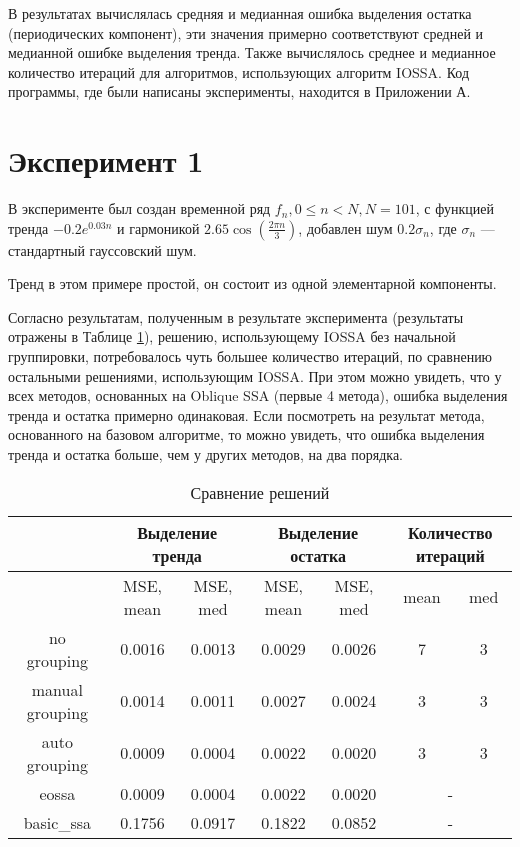 \documentclass[specialist, substylefile = spbureport.rtx, subf,href,colorlinks=true, 12pt]{disser}
\theoremstyle{definition}
\begin{document}
В результатах вычислялась средняя и медианная ошибка выделения остатка (периодических компонент), эти значения примерно соответствуют средней и медианной ошибке выделения тренда. Также вычислялось среднее и медианное количество итераций для алгоритмов, использующих алгоритм IOSSA.
Код программы, где были написаны эксперименты, находится в Приложении А.

\section{Эксперимент 1}
\label{exp1}
В эксперименте был создан временной ряд $f_n , 0\leq n < N, N=101$, с функцией тренда $-0.2 e^{0.03n}$ и гармоникой $2.65 \cos (\frac{2\pi n}{3})$, добавлен шум $0.2 \sigma_n$, где $\sigma_n$ --- стандартный гауссовский шум.

Тренд в этом примере простой, он состоит из одной элементарной компоненты.

Согласно результатам, полученным в результате эксперимента (результаты отражены в Таблице \ref{tabular:1}), решению, использующему IOSSA без начальной группировки, потребовалось чуть большее количество итераций, по сравнению остальными решениями, использующим IOSSA. При этом можно увидеть, что у всех методов, основанных на Oblique SSA (первые 4 метода), ошибка выделения тренда и остатка примерно одинаковая. Если посмотреть на результат метода, основанного на базовом алгоритме, то можно увидеть, что ошибка выделения тренда и остатка больше, чем у других методов, на два порядка.

\begin{table}[h]
\footnotesize
\caption{Сравнение решений}
\label{tabular:1}
\begin{center}
\begin{tabular}{|c | c| c| c| c| c| c|}
\hline
 \multirow{2}{}{}& \multicolumn{2}{c|}{Выделение тренда} & \multicolumn{2}{c|}{Выделение остатка} & \multicolumn{2}{c|}{Количество итераций} \\
 \hline
 & MSE, mean & MSE, med & MSE, mean & MSE, med & mean & med  \\
\hline
no grouping & 0.0016 &  0.0013 & 0.0029 &  0.0026 & 7 & 3 \\
manual grouping &  0.0014 & 0.0011 & 0.0027 & 0.0024 & 3 & 3 \\
auto grouping &  0.0009 & 0.0004 & 0.0022 & 0.0020 & 3 & 3 \\
\hline
eossa & 0.0009 & 0.0004 & 0.0022 & 0.0020 & \multicolumn{2}{c|}{-} \\
basic\_ssa &  0.1756 & 0.0917 & 0.1822 & 0.0852  & \multicolumn{2}{c|}{-} \\
\hline
\end{tabular}
\end{center}
\end{table}
\end{document}
